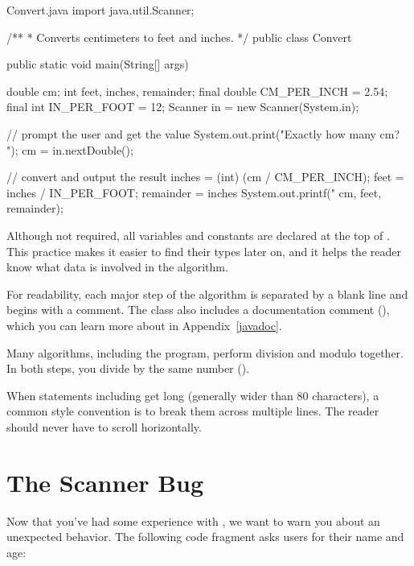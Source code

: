 
\begin{trinket}{Convert.java}
import java.util.Scanner;

/**
 * Converts centimeters to feet and inches.
 */
public class Convert {

    public static void main(String[] args) {
        double cm;
        int feet, inches, remainder;
        final double CM_PER_INCH = 2.54;
        final int IN_PER_FOOT = 12;
        Scanner in = new Scanner(System.in);

        // prompt the user and get the value
        System.out.print("Exactly how many cm? ");
        cm = in.nextDouble();

        // convert and output the result
        inches = (int) (cm / CM_PER_INCH);
        feet = inches / IN_PER_FOOT;
        remainder = inches %
        System.out.printf("%
                          cm, feet, remainder);
    }
}
\end{trinket}

Although not required, all variables and constants are declared at the top of .
This practice makes it easier to find their types later on, and it helps the reader know what data is involved in the algorithm.


For readability, each major step of the algorithm is separated by a blank line and begins with a comment.
The class also includes a documentation comment (\java{/**}), which you can learn more about in Appendix~\ref{javadoc}.

Many algorithms, including the  program, perform division and modulo together.
In both steps, you divide by the same number ().

When statements including  get long (generally wider than 80 characters), a common style convention is to break them across multiple lines.
The reader should never have to scroll horizontally.


\section{The Scanner Bug}

Now that you've had some experience with , we want to warn you about an unexpected behavior.
The following code fragment asks users for their name and age:

